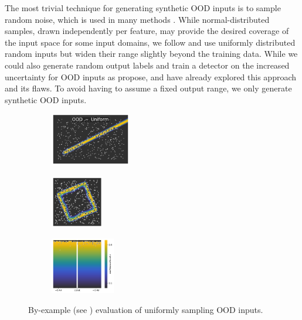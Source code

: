 The most trivial technique for generating synthetic OOD inputs is to sample random noise, which is used in many methods \cite[e.g.][]{ood-class-2022, ood-boundary-2021, ood-training-2017, ood-exposure-confidence-2021, learning-ood-confidence-2018, noise-contrastive-uq-2020}. While normal-distributed samples, drawn independently per feature, may provide the desired coverage of the input space for some input domains, we follow \textcite{ood-boundary-2021} and use uniformly distributed random inputs but widen their range slightly beyond the training data. While we could also generate random output labels and train a detector on the increased uncertainty for OOD inputs as \textcite{noise-contrastive-uq-2020} propose,  and  have already explored this approach and its flaws. To avoid having to assume a fixed output range, we only generate synthetic OOD inputs.

\begin{figure}[H]
    \centering
    \begin{subfigure}
        \centering
        \includegraphics[width=0.388\textwidth,valign=t]{ood-detection/figures/ood-synthesis/ood-line-uniform.pdf}
    \end{subfigure}
    \begin{subfigure}
        \centering
        \includegraphics[width=0.254\textwidth,valign=t]{ood-detection/figures/ood-synthesis/ood-circle-uniform.pdf}
    \end{subfigure}
    \begin{subfigure}
        \centering
        \includegraphics[width=0.308\textwidth,valign=t]{ood-detection/figures/ood-synthesis/ood-haystack-uniform.pdf}
    \end{subfigure}

    \caption[Random Synthetic OOD Samples]{By-example (see ) evaluation of uniformly sampling OOD inputs.}
    \label{fig:uniform-ood-samples}
\end{figure}

